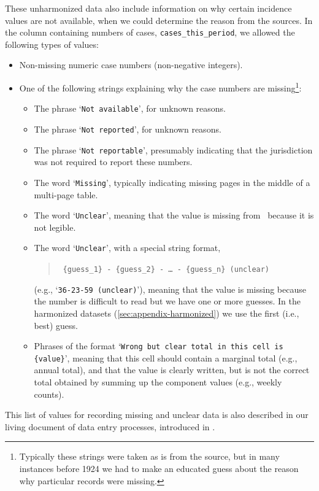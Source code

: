 \documentclass[12pt]{article}
\begin{document}
These unharmonized data also include information on why certain incidence values are not available, when we could determine the reason from the sources. In the column containing numbers of cases, \texttt{cases\_this\_period}, we allowed the following types of values:
\begin{itemize}
\item Non-missing numeric case numbers (non-negative integers).
\item One of the following strings explaining why the case numbers are missing\footnote{Typically these strings were taken as is from the source, but in many instances before 1924 we had to make an educated guess about the reason why particular records were missing.}: 
  \begin{itemize}
    \item The phrase `\texttt{Not available}', for unknown reasons.
    \item The phrase `\texttt{Not reported}', for unknown reasons.
    \item The phrase `\texttt{Not reportable}', presumably indicating that the jurisdiction was not required to report these numbers.
    \item The word `\texttt{Missing}', typically indicating missing pages in the middle of a multi-page table.
    \item The word `\texttt{Unclear}', meaning that the value is missing from \datacronym\ because it is not legible.
    \item The word `\texttt{Unclear}', with a special string format,
    \begin{quote}
      \tt
      \{guess\_1\} - \{guess\_2\} - \dots\ - \{guess\_n\} (unclear) 
    \end{quote}
    (e.g., `\texttt{36-23-59 (unclear)}'), meaning that the value is missing because the number is difficult to read but we have one or more guesses. In the harmonized datasets (\cref{sec:appendix-harmonized}) we use the first (i.e., best) guess.
    \item Phrases of the format `\texttt{Wrong but clear total in this cell is \{value\}}', meaning that this cell should contain a marginal total (e.g., annual total), and that the value is clearly written, but is not the correct total obtained by summing up the component values (e.g., weekly counts).
  \end{itemize}
\end{itemize}

\noindent This list of values for recording missing and unclear data is also described in our living document of data entry processes, introduced in .
\end{document}
